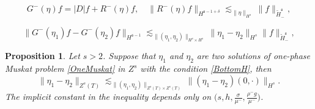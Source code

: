 \documentclass[10pt,a4paper]{amsart}
\newtheorem{proposition}{Proposition}
\begin{document}
\begin{equation} \label{GfDRf}
G^-(\eta)f = |D|f + R^-(\eta)f, \quad \| R^-(\eta)f\|_{H^{\mathfrak{s} - 1+\delta}} \lesssim_{\|\eta\|_{H^s}} \|f\|_{\widetilde{H}^\mathfrak{s}_-},
\end{equation}

\begin{equation} \label{GetaDiff}
\| G^-(\eta_1)f - G^-(\eta_2)f\|_{H^{\mathfrak{s} - 1}} \lesssim_{\|(\eta_1, \eta_2)\|_{H^s \times H^s}}\|\eta_1 - \eta_2 \|_{H^s} \|f\|_{\widetilde{H}^{\mathfrak{s}}_-},
\end{equation}

\begin{proposition}\label{t:propConOne}
Let $s>2$.
Suppose that $\eta_1$ and $\eta_2$ are two solutions of one-phase Muskat problem \eqref{OneMuskat} in $Z^s$ with the condition \eqref{BottomH}, then
\begin{equation} \label{ContractOneMuskat}
 \|\eta_1 - \eta_2\|_{Z^s(T)} \lesssim_{\|(\eta_1, \eta_2)\|_{Z^s(T) \times Z^s(T)}} \|(\eta_1 - \eta_2)(0,\cdot) \|_{H^s}.
\end{equation}
The implicit constant in the inequality depends only on $\big(s,h, \frac{\sigma}{\mu^-},  \frac{\rho^- g}{ \mu^-}\big)$.
\end{proposition}
\end{document}
